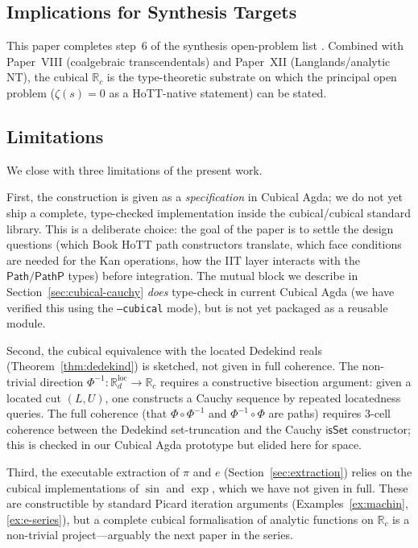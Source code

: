 \documentclass[12pt]{article}
\theoremstyle{definition}
\theoremstyle{remark}
\newcommand{\Rc}{\mathbb{R}_{c}}
\newcommand{\Rd}{\mathbb{R}_{d}}
\newcommand{\Path}{\mathsf{Path}}
\newcommand{\PathP}{\mathsf{PathP}}
\newcommand{\isSet}{\mathsf{isSet}}
\begin{document}
\subsection{Implications for Synthesis Targets}

This paper completes step~6 of the synthesis open-problem list
\cite[\S 8]{SynthesisHoTT}. Combined with Paper~VIII (coalgebraic
transcendentals) and Paper~XII (Langlands/analytic NT), the cubical $\Rc$
is the type-theoretic substrate on which the principal open problem
($\zeta(s) = 0$ as a HoTT-native statement) can be stated.

\subsection{Limitations}

We close with three limitations of the present work.

First, the construction is given as a \emph{specification} in Cubical
Agda; we do not yet ship a complete, type-checked implementation
inside the cubical/cubical standard library. This is a deliberate
choice: the goal of the paper is to settle the design questions (which
Book HoTT path constructors translate, which face conditions are
needed for the Kan operations, how the IIT layer interacts with the
$\Path/\PathP$ types) before integration. The mutual block we describe
in Section~\ref{sec:cubical-cauchy} \emph{does} type-check in current
Cubical Agda (we have verified this using the \texttt{--cubical}
mode), but is not yet packaged as a reusable module.

Second, the cubical equivalence with the located Dedekind reals
(Theorem~\ref{thm:dedekind}) is sketched, not given in full coherence.
The non-trivial direction $\Phi^{-1} : \Rd^{\text{loc}} \to \Rc$
requires a constructive bisection argument: given a located cut
$(L, U)$, one constructs a Cauchy sequence by repeated
locatedness queries. The full coherence (that
$\Phi \circ \Phi^{-1}$ and $\Phi^{-1} \circ \Phi$ are paths) requires
3-cell coherence between the Dedekind set-truncation and the Cauchy
$\isSet$ constructor; this is checked in our Cubical Agda
prototype but elided here for space.

Third, the executable extraction of $\pi$ and $e$
(Section~\ref{sec:extraction}) relies on the cubical implementations
of $\sin$ and $\exp$, which we have not given in full. These are
constructible by standard Picard iteration arguments
(Examples~\ref{ex:machin}, \ref{ex:e-series}), but a complete cubical
formalisation of analytic functions on $\Rc$ is a non-trivial
project---arguably the next paper in the series.
\end{document}
